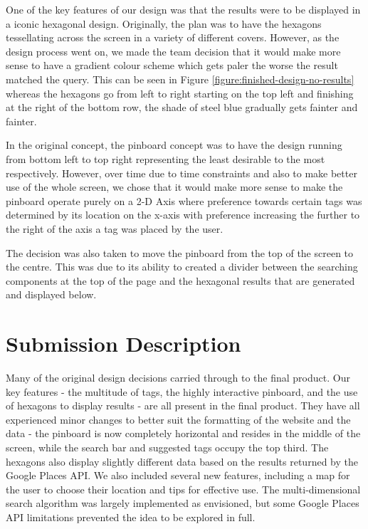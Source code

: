 \documentclass[10pt,a4paper]{article}
\begin{document}
One of the key features of our design was that the results were to be displayed in a iconic hexagonal design. Originally, the plan was to have the hexagons tessellating across the screen in a variety of different covers. However, as the design process went on, we made the team decision that it would make more sense to have a gradient colour scheme which gets paler the worse the result matched the query. This can be seen in Figure \ref{figure:finished-design-no-results} whereas the hexagons go from left to right starting on the top left and finishing at the right of the bottom row, the shade of steel blue gradually gets fainter and fainter.

In the original concept, the pinboard concept was to have the design running from bottom left to top right representing the least desirable to the most respectively. However, over time due to time constraints and also to make better use of the whole screen, we chose that it would make more sense to make the pinboard operate purely on a 2-D Axis where preference towards certain tags was determined by its location on the x-axis with preference increasing the further to the right of the axis a tag was placed by the user.

The decision was also taken to move the pinboard from the top of the screen to the centre. This was due to its ability to created a divider between the searching components at the top of the page and the hexagonal results that are generated and displayed below.

\section*{Submission Description}

Many of the original design decisions carried through to the final product. Our key features - the multitude of tags, the highly interactive pinboard, and the use of hexagons to display results - are all present in the final product. They have all experienced minor changes to better suit the formatting of the website and the data - the pinboard is now completely horizontal and resides in the middle of the screen, while the search bar and suggested tags occupy the top third. The hexagons also display slightly different data based on the results returned by the Google Places API. We also included several new features, including a map for the user to choose their location and tips for effective use. The multi-dimensional search algorithm was largely implemented as envisioned, but some Google Places API limitations prevented the idea to be explored in full.
\end{document}
